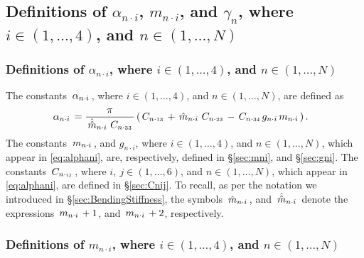 \documentclass[preprint,12pt,times]{elsarticle}
\newcommand{\plus}[1]{\hat{#1}}
\newcommand{\plusplus}[1]{\plus{\plus{#1}}}
\numberwithin{equation}{section}
\newcommand{\msub}[2]{
\IfEqCase{#2}{
      {i}{\, m_{#1\cdot #2}\,}%
  }[\,m_{#1\cdot {\scriptscriptstyle #2}}\,]}
\newcommand{\gsub}[2]{g_{#1\cdot #2}}
\newcommand{\Csub}[2]{
   \IfEqCase{#2}{
          {xxxx}{\,\beta_{ {#1}\cdot { #2}}\,}%
      }[\,C_{ {#1}\cdot {\scriptscriptstyle #2}}\,]}
\newcommand{\alphasub}[2]{
\IfEqCase{#2}{
		{i}{\,\alpha_{ {#1}\cdot { \scriptstyle #2}}\,}%
	}[\,\alpha_{ {#1}\cdot {\scriptscriptstyle #2}}\,]}
\newcommand{\infour}{\in(1,\ldots,4)}
\newcommand{\insix}{\in(1,\ldots,6)}
\newcommand{\inN}{\in(1,\ldots,N)}
\newcommand{\Subs}[3]{
\IfEqCase{#3}{
		{i}{\,#1_{ {#2}\cdot { \scriptstyle #3}}\,}%
	}[\,#1_{ {#2}\cdot {\scriptscriptstyle #3}}\,]}
\renewcommand{\>}{$\Rightarrow$}
\begin{document}
\subsection{Definitions of $\alpha_{n\cdot i}$, $m_{n\cdot i}$, and $\gamma_{n}$, where $i\infour$, and $n\inN$\label{sec:alphamgni}} %


\subsubsection{Definitions of $\alpha_{n\cdot i}$, where $i\infour$, and $n\inN$\label{sec:alphani}} %

The constants $\alphasub{n}{i}$, where $i\infour$, and $n\inN$, are defined as
\begin{align}
	\alphasub{n}{i} & = \frac{\pi}{\Subs{\plusplus{m}}{n}{i} \Csub{n}{33}}\left(\Csub{n}{13} + \Subs{\plus{m}}{n}{i}\Csub{n}{23} - \Csub{n}{34} \gsub{n}{i} \msub{n}{i}\right).
\label{eq:alphani}
\end{align}%
The constants $\msub{n}{i}$, and $\gsub{n}{i}$, where $i\infour$, and $n\inN$, which appear in \eqref{eq:alphani}, are, respectively, defined in \S\ref{sec:mni}, and \S\ref{sec:gni}.%
The constants $\Csub{n}{ij}$, where $i,~j\insix$, and $n\inN$, which  appear in \eqref{eq:alphani}, are defined in \S\ref{sec:Cnij}. %
To recall, as per the notation we introduced in \S\ref{sec:BendingStiffness}, the symbols $\Subs{\plus{m}}{n}{i}$, and $\Subs{\plusplus{m}}{n}{i}$ denote the expressions $\Subs{m}{n}{i}+1$, and $\Subs{m}{n}{i}+2$, respectively. %

\subsubsection{Definitions of $m_{n\cdot i}$, where $i\infour$, and $n\inN$\label{sec:mni}}
\end{document}

